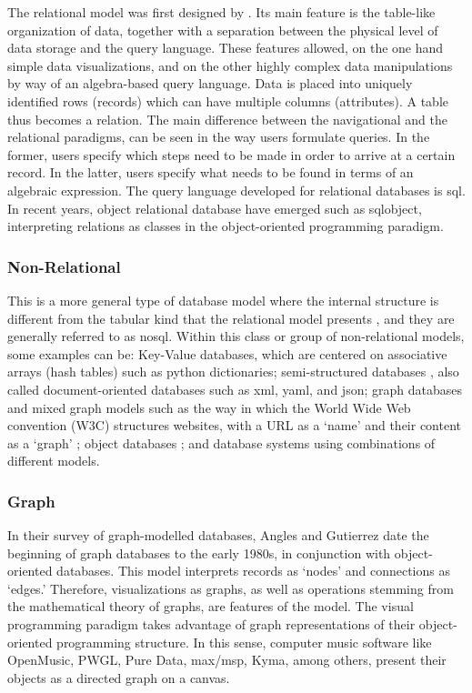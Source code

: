 The relational model was first designed by \textcites{Codd:1970:RMD:362384.362685}{Codd72relationalcompleteness}. Its main feature is the table-like organization of data, together with a separation between the physical level of data storage and the query language. These features allowed, on the one hand simple data visualizations, and on the other highly complex data manipulations by way of an algebra-based query language. Data is placed into uniquely identified rows (records) which can have multiple columns (attributes). A table thus becomes a relation. The main difference between the navigational and the relational paradigms, can be seen in the way users formulate queries. In the former, users specify which steps need to be made in order to arrive at a certain record. In the latter, users specify what needs to be found in terms of an algebraic expression. The query language developed for relational databases is \gls{sql}. In recent years, object relational database have emerged such as \gls{sqlobject}, interpreting relations as classes in the object-oriented programming paradigm.

\subsubsection{Non-Relational}
\label{model:nonrelational}

This is a more general type of database model where the internal structure is different from the tabular kind that the relational model presents , and they are generally referred to as \gls{nosql}. Within this class or group of non-relational models, some examples can be: Key-Value databases, which are centered on associative arrays (hash tables) such as python dictionaries; semi-structured databases , also called document-oriented databases such as \gls{xml}, \gls{yaml}, and \gls{json}; graph databases and mixed graph models such as the way in which the World Wide Web convention (W3C) structures websites, with a URL as a `name' and their content as a `graph' ; object databases ; and database systems using combinations of different models.

\subsubsection{Graph}
\label{model:graph}

In their survey of graph-modelled databases, Angles and Gutierrez \parencite{2008:graph/anglesgutierrez/survey} date the beginning of graph databases to the early 1980s, in conjunction with object-oriented databases. This model interprets records as `nodes' and connections as `edges.' Therefore, visualizations as graphs, as well as operations stemming from the mathematical theory of graphs, are features of the model. The visual programming paradigm takes advantage of graph representations of their object-oriented programming structure. In this sense, computer music software like OpenMusic, PWGL, Pure Data, \gls{max/msp}, Kyma, among others, present their objects as a directed graph on a canvas.


